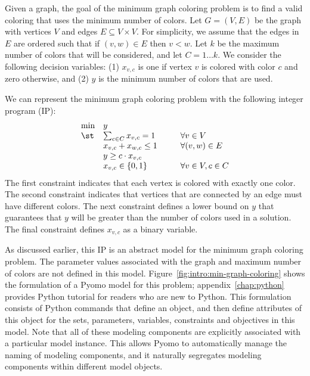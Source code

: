 Given a graph, the goal of the minimum graph coloring problem is to find
a valid coloring that uses the minimum number of colors.  Let $G=(V,E)$
be the graph with vertices $V$ and edges $E \subseteq V \times V$.
For simplicity, we assume that the edges in $E$ are ordered such that if
$(v,w) \in E$ then $v < w$.  Let $k$ be the maximum number of colors that will be considered,
and let $C = 1 \ldots k$.  We consider the following decision variables: (1) $x_{v,c}$ is one if vertex $v$ is colored with color $c$ and zero otherwise, and (2) $y$ is the minimum number of colors that are used.

We can represent the minimum graph coloring problem with the following integer program (IP):
\begin{equation}
\label{eqn:intro:min-graph-coloring}
\begin{array}{lll}
\min & y & \\
\st & \sum_{c \in C} x_{v,c} = 1 & \forall v \in V\\
    & x_{v,c} + x_{w,c} \leq 1 \hspace{0.25in}& \forall (v,w) \in E\\
    & y \geq c \cdot x_{v,c} & \\
    & x_{v,c} \in \{0,1\} & \forall v \in V, c \in C
\end{array}
\end{equation}
The first constraint indicates that each vertex is colored with exactly one color.
The second constraint indicates that vertices that are connected by an edge must have different
colors.  The next constraint defines a lower bound on $y$ that guarantees that $y$ will be
greater than the number of colors used in a solution.  The final constraint defines $x_{v,c}$ as
a binary variable.

As discussed earlier, this IP is an abstract model for the minimum
graph coloring problem.  The parameter values associated with the
graph and maximum number of colors are not defined in this model.
Figure~\ref{fig:intro:min-graph-coloring} shows the formulation of a Pyomo
model for this problem;  appendix~\ref{chap:python} provides Python tutorial for readers who are new to Python. This formulation consists of Python commands that
define an  object, and then define attributes of this object for the
sets, parameters, variables, constraints and objectives in this model.
Note that all of these modeling components are explicitly associated
with a particular model instance.  This allows Pyomo to automatically
manage the naming of modeling components, and it naturally segregates
modeling components within different model objects.

